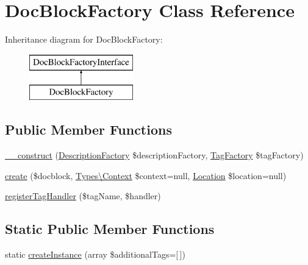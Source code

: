 \hypertarget{classphp_documentor_1_1_reflection_1_1_doc_block_factory}{}\section{Doc\+Block\+Factory Class Reference}
\label{classphp_documentor_1_1_reflection_1_1_doc_block_factory}
Inheritance diagram for Doc\+Block\+Factory\+:\begin{figure}[H]
\begin{center}
\leavevmode
\includegraphics[height=2.000000cm]{classphp_documentor_1_1_reflection_1_1_doc_block_factory}
\end{center}
\end{figure}
\subsection*{Public Member Functions}
\begin{DoxyCompactItemize}
\item 
\mbox{\hyperlink{classphp_documentor_1_1_reflection_1_1_doc_block_factory_ad4bd68911188b861c6f1625903c35c8d}{\+\_\+\+\_\+construct}} (\mbox{\hyperlink{classphp_documentor_1_1_reflection_1_1_doc_block_1_1_description_factory}{Description\+Factory}} \$description\+Factory, \mbox{\hyperlink{interfacephp_documentor_1_1_reflection_1_1_doc_block_1_1_tag_factory}{Tag\+Factory}} \$tag\+Factory)
\item 
\mbox{\hyperlink{classphp_documentor_1_1_reflection_1_1_doc_block_factory_a251d38c040d9a6165cecd6af41076d56}{create}} (\$docblock, \mbox{\hyperlink{classphp_documentor_1_1_reflection_1_1_types_1_1_context}{Types\textbackslash{}\+Context}} \$context=null, \mbox{\hyperlink{classphp_documentor_1_1_reflection_1_1_location}{Location}} \$location=null)
\item 
\mbox{\hyperlink{classphp_documentor_1_1_reflection_1_1_doc_block_factory_ab57c71828fcf271fc43f9422ca1163d2}{register\+Tag\+Handler}} (\$tag\+Name, \$handler)
\end{DoxyCompactItemize}
\subsection*{Static Public Member Functions}
\begin{DoxyCompactItemize}
\item 
static \mbox{\hyperlink{classphp_documentor_1_1_reflection_1_1_doc_block_factory_a220aa312016b6fa0c9a6c4bf61a7ead4}{create\+Instance}} (array \$additional\+Tags=\mbox{[}$\,$\mbox{]})
\end{DoxyCompactItemize}


